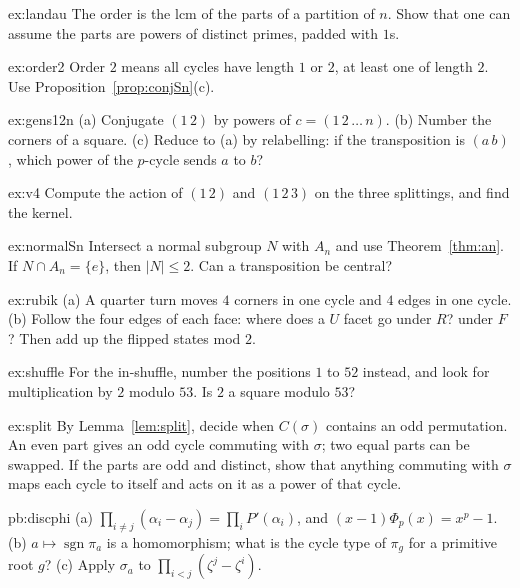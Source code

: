 \begin{hint}{ex:landau}
The order is the lcm of the parts of a partition of $n$. Show that one can assume the parts are powers of distinct primes, padded with $1$s.
\end{hint}
\begin{hint}{ex:order2}
Order $2$ means all cycles have length $1$ or $2$, at least one of length $2$. Use Proposition~\ref{prop:conjSn}(c).
\end{hint}
\begin{hint}{ex:gens12n}
(a) Conjugate $(1\,2)$ by powers of $c=(1\,2\,\dots\,n)$. (b) Number the corners of a square. (c) Reduce to (a) by relabelling: if the transposition is $(a\,b)$, which power of the $p$-cycle sends $a$ to $b$?
\end{hint}
\begin{hint}{ex:v4}
Compute the action of $(1\,2)$ and $(1\,2\,3)$ on the three splittings, and find the kernel.
\end{hint}
\begin{hint}{ex:normalSn}
Intersect a normal subgroup $N$ with $A_n$ and use Theorem~\ref{thm:an}. If $N\cap A_n=\{e\}$, then $|N|\le2$. Can a transposition be central?
\end{hint}
\begin{hint}{ex:rubik}
(a) A quarter turn moves $4$ corners in one cycle and $4$ edges in one cycle. (b) Follow the four edges of each face: where does a $U$ facet go under $R$? under $F$? Then add up the flipped states mod $2$.
\end{hint}
\begin{hint}{ex:shuffle}
For the in-shuffle, number the positions $1$ to $52$ instead, and look for multiplication by $2$ modulo $53$. Is $2$ a square modulo $53$?
\end{hint}
\begin{hint}{ex:split}
By Lemma~\ref{lem:split}, decide when $C(\sigma)$ contains an odd permutation. An even part gives an odd cycle commuting with $\sigma$; two equal parts can be swapped. If the parts are odd and distinct, show that anything commuting with $\sigma$ maps each cycle to itself and acts on it as a power of that cycle.
\end{hint}

\begin{hint}{pb:discphi}
(a) $\prod_{i\ne j}(\alpha_i-\alpha_j)=\prod_iP'(\alpha_i)$, and $(x-1)\Phi_p(x)=x^p-1$. (b) $a\mapsto\operatorname{sgn}\pi_a$
is a homomorphism; what is the cycle type of $\pi_g$ for a primitive root $g$? (c) Apply $\sigma_a$ to
$\prod_{i<j}(\zeta^j-\zeta^i)$.
\end{hint}

